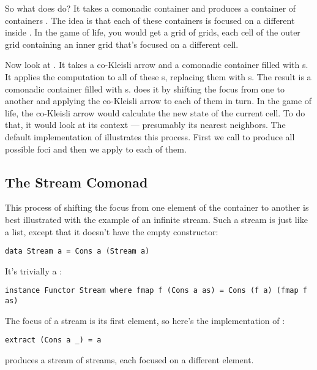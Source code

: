 So what does  do? It takes a comonadic container
 and produces a container of containers .
The idea is that each of these containers is focused on a different
 inside . In the game of life, you would get a
grid of grids, each cell of the outer grid containing an inner grid
that's focused on a different cell.

Now look at . It takes a co-Kleisli arrow and a comonadic
container  filled with s. It applies the
computation to all of these s, replacing them with
s. The result is a comonadic container filled with
s.  does it by shifting the focus from one
 to another and applying the co-Kleisli arrow to each of them
in turn. In the game of life, the co-Kleisli arrow would calculate the
new state of the current cell. To do that, it would look at its context
--- presumably its nearest neighbors. The default implementation of
 illustrates this process. First we call
 to produce all possible foci and then we apply
 to each of them.

\subsection{The Stream Comonad}\label{the-stream-comonad}

This process of shifting the focus from one element of the container to
another is best illustrated with the example of an infinite stream. Such
a stream is just like a list, except that it doesn't have the empty
constructor:

\begin{verbatim}
data Stream a = Cons a (Stream a)
\end{verbatim}

It's trivially a :

\begin{verbatim}
instance Functor Stream where fmap f (Cons a as) = Cons (f a) (fmap f as)
\end{verbatim}

The focus of a stream is its first element, so here's the implementation
of :

\begin{verbatim}
extract (Cons a _) = a
\end{verbatim}

 produces a stream of streams, each focused on a
different element.

